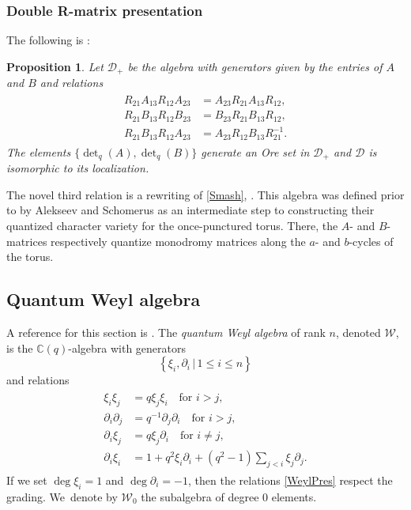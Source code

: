 \documentclass[JEP,XML,SOM,Unicode,published]{cedram}
\newtheorem{prop}[thm]{Proposition}
\theoremstyle{definition}
\newcommand{\CC}{\mathbb{C}}
\newcommand{\DD}{\mathcal{D}}
\newcommand{\WW}{\mathcal{W}}
\newcommand{\del}{\partial}
\begin{document}
\subsubsection{Double R-matrix presentation}
The following is \cite[Prop.\,1.8.3(b)]{VarVassRoot}:

\begin{prop}\label{DoublePres}
Let $\DD_+$ be the algebra with generators given by the entries of $A$ and $B$ and relations
\begin{align}
\begin{split}
R_{21}A_{13}R_{12}A_{23}&=A_{23}R_{21}A_{13}R_{12},\\
R_{21}B_{13}R_{12}B_{23}&=B_{23}R_{21}B_{13}R_{12},\\
R_{21}B_{13}R_{12}A_{23}&=A_{23}R_{12}B_{13}R_{21}^{-1}.
\end{split}
\label{ABPres}
\end{align}
The elements $\{\det_q(A),\det_q(B)\}$ generate an Ore set in $\DD_+$ and $\DD$ is isomorphic to its localization.
\end{prop}

The novel third relation is a rewriting of \eqref{Smash}, \cf \cite[A.5]{VarVassRoot}.
This algebra was defined prior to \cite{VarVassRoot} by Alekseev and Schomerus \cite{AlekScho} as an intermediate step to constructing their quantized character variety for the once-punctured torus.
There, the $A$- and $B$-matrices respectively quantize monodromy matrices along the $a$- and $b$-cycles of the torus.

\subsection{Quantum Weyl algebra}\label{QWeyl}
A reference for this section is \cite{GiaZhaQW}.
The \textit{quantum Weyl algebra} of rank $n$, denoted $\WW$, is the $\CC(q)$-algebra with generators
\[
\left\{ \xi_i, \del_i\,|\, 1\le i\le n\right\}
\]
and relations
\begin{align}
\begin{split}
\xi_i\xi_j&= q\xi_j\xi_i\quad\text{for }i>j,\\
\del_i\del_j&=q^{-1}\del_j\del_i\quad\text{for }i>j,\\
\del_i\xi_j&=q\xi_j\del_i\quad\text{for }i\not=j,\\
\del_i\xi_i&=1+q^2\xi_i\del_i+(q^2-1)\sum_{j<i}\xi_j\del_j.
\end{split}\label{WeylPres}
\end{align}
If we set $\deg \xi_i=1$ and $\deg\del_i=-1$, then the relations \eqref{WeylPres} respect the grading. We~denote by $\WW_0$ the subalgebra of degree 0 elements.
\end{document}
